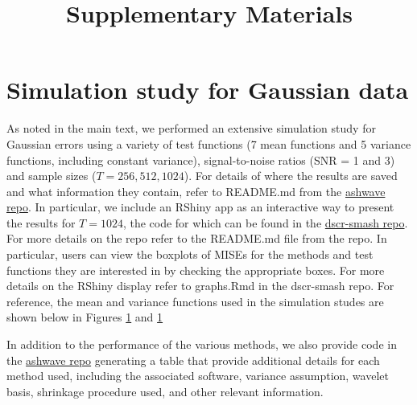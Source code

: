 \documentclass[12pt]{article}
\newcommand{\beginsupplement}{%
        \setcounter{table}{0}
        \renewcommand{\thetable}{S\arabic{table}}%
        \setcounter{figure}{0}
        \renewcommand{\thefigure}{S\arabic{figure}}%
     }
\begin{document}
\beginsupplement

\title{\textbf{Supplementary Materials}}
\date{}
\maketitle

\section{Simulation study for Gaussian data}
As noted in the main text, we performed an extensive simulation study for Gaussian errors using a variety of test functions (7 mean functions and 5 variance functions, including constant variance), signal-to-noise ratios (SNR = 1 and 3) and sample sizes ($T=256,512,1024$). For details of where the results are saved and what information they contain, refer to README.md from the \href{https://github.com/stephenslab/ashwave}{ashwave repo}. In particular, we include an RShiny app as an interactive way to present the results for $T=1024$, the code for which can be found in the \href{https://github.com/zrxing/dscr-smash}{dscr-smash repo}. For more details on the repo refer to the README.md file from the repo. In particular, users can view the boxplots of MISEs for the methods and test functions they are interested in by checking the appropriate boxes. For more details on the RShiny display refer to graphs.Rmd in the dscr-smash repo. For reference, the mean and variance functions used in the simulation studes are shown below in Figures \ref{} and \ref{}

In addition to the performance of the various methods, we also provide code in the \href{https://github.com/stephenslab/ashwave}{ashwave repo} generating a table that provide additional details for each method used, including the associated software, variance assumption, wavelet basis, shrinkage procedure used, and other relevant information.
\end{document}
